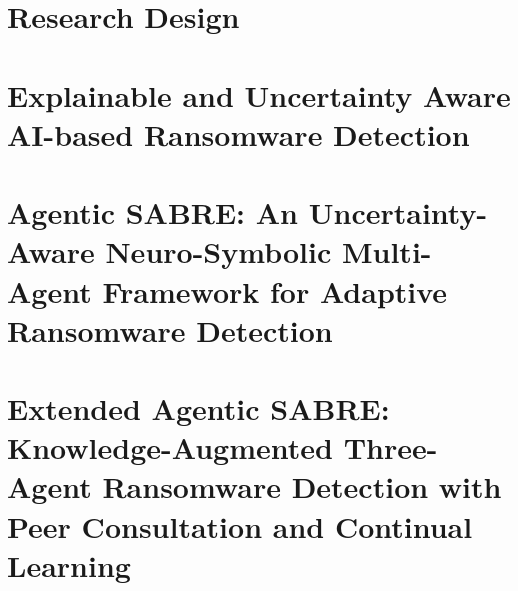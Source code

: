 \chapter{Research Design}


\chapter{Explainable and Uncertainty Aware AI-based Ransomware Detection}


\chapter{Agentic SABRE: An Uncertainty-Aware Neuro-Symbolic Multi-Agent Framework for Adaptive Ransomware Detection}


\chapter{Extended Agentic SABRE: Knowledge-Augmented Three-Agent Ransomware Detection with Peer Consultation and Continual Learning}


